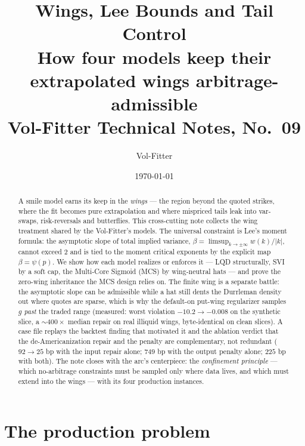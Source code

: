\documentclass[11pt]{article}
\title{\textbf{Wings, Lee Bounds and Tail Control}\\[2pt]
\large How four models keep their extrapolated wings arbitrage-admissible\\[2pt]
\normalsize Vol-Fitter Technical Notes, No.~09}
\author{Vol-Fitter}
\date{\today}
\begin{document}
\maketitle


\begin{abstract}
A smile model earns its keep in the \emph{wings} --- the region beyond the
quoted strikes, where the fit becomes pure extrapolation and where mispriced
tails leak into var-swaps, risk-reversals and butterflies. This cross-cutting
note collects the wing treatment shared by the Vol-Fitter's models. The
universal constraint is Lee's moment formula: the asymptotic slope of total
implied variance, $\beta=\limsup_{k\to\pm\infty}w(k)/|k|$, cannot exceed $2$
and is tied to the moment critical exponents by the explicit map
$\beta=\psi(p)$. We show how each model realizes or enforces it --- LQD
structurally, SVI by a soft cap, the Multi-Core Sigmoid (MCS) by wing-neutral
hats --- and prove the zero-wing inheritance the MCS design relies on. The finite wing is a
separate battle: the asymptotic slope can be admissible while a hat still
dents the Durrleman density out where quotes are sparse, which is why the
default-on put-wing regularizer samples $g$ \emph{past} the traded range
(measured: worst violation $-10.2\to-0.008$ on the synthetic slice, a
$\sim400\times$ median repair on real illiquid wings, byte-identical on clean
slices). A case file replays the backtest finding that motivated it and the
ablation verdict that the de-Americanization repair and the penalty are
complementary, not redundant ($92\to25$ bp with the input repair alone;
$749$ bp with the output penalty alone; $225$ bp with both). The note closes
with the arc's centerpiece: the \emph{confinement principle} --- which
no-arbitrage constraints must be sampled only where data lives, and which
must extend into the wings --- with its four production instances.
\end{abstract}

\tableofcontents
\newpage

\section{The production problem}
\label{sec:problem}
\end{document}
